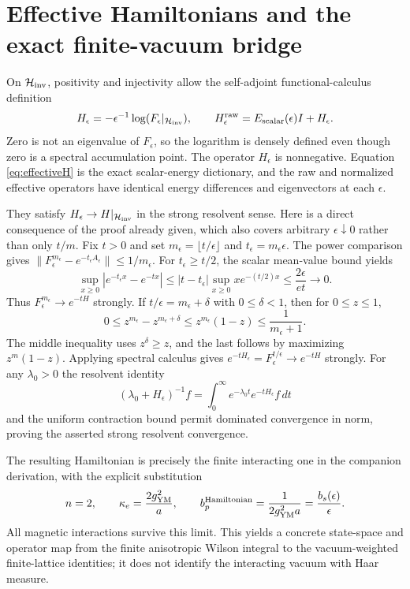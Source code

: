 \documentclass[11pt]{article}
\begin{document}
\section{Effective Hamiltonians and the exact finite-vacuum bridge}

On $\mathcal H_{\rm inv}$, positivity and injectivity allow the
self-adjoint functional-calculus definition
\begin{equation}\label{eq:effectiveH}
 H_\epsilon=-\epsilon^{-1}\log(F_\epsilon|_{\mathcal H_{\rm inv}}),
 \qquad
 H_\epsilon^{\rm raw}=E_{\rm scalar}(\epsilon)I+H_\epsilon.
\end{equation}
Zero is not an eigenvalue of $F_\epsilon$, so the logarithm is densely
defined even though zero is a spectral accumulation point. The operator
$H_\epsilon$ is nonnegative. Equation \eqref{eq:effectiveH} is the exact
scalar-energy dictionary, and the raw and normalized effective operators
have identical energy differences and eigenvectors at each $\epsilon$.

They satisfy $H_\epsilon\to H|_{\mathcal H_{\rm inv}}$ in the strong
resolvent sense. Here is a direct consequence of the proof already given,
which also covers arbitrary $\epsilon\downarrow0$ rather than only
$t/m$. Fix $t>0$ and set $m_\epsilon=\lfloor t/\epsilon\rfloor$ and
$t_\epsilon=m_\epsilon\epsilon$. The power comparison gives
$\|F_\epsilon^{m_\epsilon}-e^{-t_\epsilon A_\epsilon}\|
\leq1/m_\epsilon$. For $t_\epsilon\geq t/2$, the scalar mean-value
bound yields
\[
 \sup_{x\geq0}|e^{-t_\epsilon x}-e^{-tx}|
 \leq|t-t_\epsilon|\sup_{x\geq0}xe^{-(t/2)x}
 \leq\frac{2\epsilon}{et}\longrightarrow0.
\]
Thus $F_\epsilon^{m_\epsilon}\to e^{-tH}$ strongly. If
$t/\epsilon=m_\epsilon+\delta$ with $0\leq\delta<1$, then for
$0\leq z\leq1$,
\[
 0\leq z^{m_\epsilon}-z^{m_\epsilon+\delta}
 \leq z^{m_\epsilon}(1-z)
 \leq\frac1{m_\epsilon+1}.
\]
The middle inequality uses $z^\delta\geq z$, and the last follows by
maximizing $z^m(1-z)$. Applying spectral calculus gives
$e^{-tH_\epsilon}=F_\epsilon^{t/\epsilon}\to e^{-tH}$ strongly.
For any $\lambda_0>0$ the resolvent identity
\[
 (\lambda_0+H_\epsilon)^{-1}f
 =\int_0^\infty e^{-\lambda_0t}e^{-tH_\epsilon}f\,dt
\]
and the uniform contraction bound permit dominated convergence in norm,
proving the asserted strong resolvent convergence.

The resulting Hamiltonian is precisely the finite interacting one in
the companion derivation, with the explicit substitution
\begin{equation}\label{eq:companiondictionary}
 n=2,\qquad \kappa_e=\frac{2g_{\rm YM}^2}{a},\qquad
 b_p^{\rm Hamiltonian}=\frac1{2g_{\rm YM}^2a}
                       =\frac{b_s(\epsilon)}\epsilon.
\end{equation}
All magnetic interactions survive this limit. This yields a concrete
state-space and operator map from the finite anisotropic Wilson integral
to the vacuum-weighted finite-lattice identities; it does not identify
the interacting vacuum with Haar measure.
\end{document}

